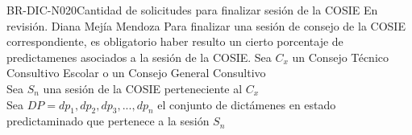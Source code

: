 \begin{BusinessRule}{BR-DIC-N020}{Cantidad de solicitudes para finalizar sesión de la COSIE}
	{\bcCondition}    %
	{\btEnabler}     %
	{\blControlling}    %
	\BRItem[Estado] En revisión.
	 Diana Mejía Mendoza
	\BRItem[Descripción] Para finalizar una sesión de consejo de la COSIE correspondiente, es obligatorio haber resulto un cierto porcentaje de predictamenes asociados a la sesión de la COSIE.
	\BRItem[Sentencia] 
	Sea $C_{x}$ un Consejo Técnico Consultivo Escolar o un Consejo General Consultivo\\
	Sea $S_{n}$ una sesión de la COSIE perteneciente al $C_{x}$\\
	Sea $DP = {dp_{1}, dp_{2}, dp_{3}, ... , dp_{n}}$ el conjunto de dictámenes en estado predictaminado que pertenece a la sesión $S_{n}$
	\begin{center}
	\end{center}

\end{BusinessRule}


